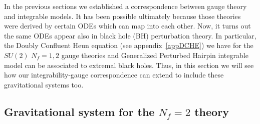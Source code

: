 \documentclass[11pt,a4paper]{elsarticle}
\numberwithin{figure}{section}
\numberwithin{table}{section}
\begin{document}
In the previous sections we established a correspondence between gauge theory and integrable models. It has been possible ultimately because those theories were derived by certain ODEs which can map into each other. Now, it turns out the same ODEs appear also in black hole (BH) perturbation theory. In particular, the Doubly Confluent Heun equation (see appendix~\ref{appDCHE}) we have for the $SU(2)$ $N_f=1,2$ gauge theories and Generalized Perturbed Hairpin integrable model can be associated to extremal black holes. Thus, in this section we will see how our integrability-gauge correspondence can extend to include these gravitational systems too.

\subsection{Gravitational system for the $N_f=2$ theory}


\end{document}
